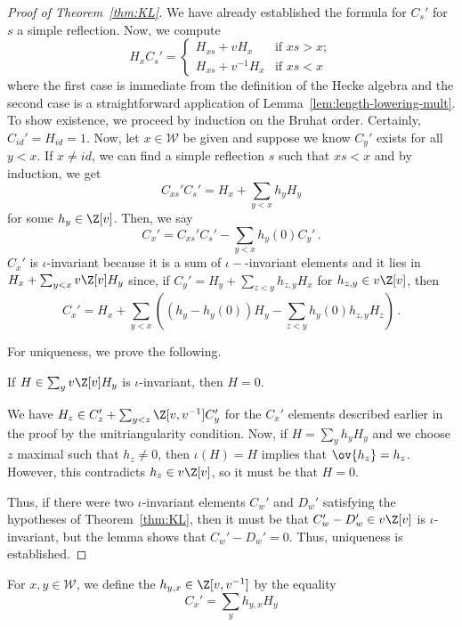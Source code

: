 \documentclass[11pt,leqno,oneside]{amsart}
\numberwithin{thm}{section}
\renewcommand{\W}{\mathcal{W}}
\begin{document}
\begin{proof}[Proof of Theorem~\ref{thm:KL}]
  We have already established the formula for \(C_s'\) for \(s\) a
  simple reflection. Now, we compute \[
    H_x C_s' =
    \begin{cases}
      H_{xs} + vH_x & \text{if } xs > x;\\
      H_{xs} + v^{-1} H_x & \text{if } xs < x
    \end{cases}
  \]
  where the first case is immediate from the definition of the Hecke
  algebra and the second case is a straightforward application
  of Lemma~\ref{lem:length-lowering-mult}. 
  To show existence, we proceed by induction on
  the Bruhat order. Certainly, \(C_{id}' = H_{id} = 1\). Now, let \(x
  \in \W\) be 
  given and suppose we know \(C_y'\) exists for all \(y < x\). If
  \(x \neq id\), we can find a simple reflection \(s\) such that \(xs
  < x\) and by induction, we get \[
    C_{xs}' C_s' = H_x + \sum_{y < x} h_y H_y
  \]
  for some \(h_y \in \Z[v]\). Then, we say \[
    C_x' = C_{xs}' C_s' - \sum_{y < x} h_y(0) C_y' \,.
  \]
  \(C_x'\) is \(\iota\)-invariant because it is a sum of
  \(\iota-\)-invariant elements and it lies in \(H_x + \sum_{y <
    x}v\Z[v] H_y \) since, if \(C_y' = H_y + \sum_{z < y} h_{z,y} H_x\) for
  \(h_{z,y} \in v\Z[v]\),
  then \[
    C_x' = H_x + \sum_{y < x} \left( (h_y - h_y(0)) H_y - \sum_{z<y}
      h_y(0) h_{z,y} H_z \right) \,. 
  \]

  For uniqueness, we prove the following.
  \begin{lem}
    If \(H \in \sum_y v \Z[v] H_y\) is \(\iota\)-invariant, then \(H =
    0\). 
  \end{lem}
  We have \(H_z \in C_z' + \sum_{y < z}\Z[v,v^{-1}] C_y'\) for the
  \(C_x'\) elements described earlier in the proof by the
  unitriangularity condition.  Now, if \(H = \sum_y h_y H_y\) and we
  choose \(z\) maximal such that \(h_z \neq 0\), then \(\iota(H) = H\)
  implies that \(\ov{h_z} = h_z\). However, this contradicts \(h_z \in
  v\Z[v]\), so it must be that \(H = 0\).

  Thus, if there were two \(\iota\)-invariant elements \(C_w'\) and
  \(D_w'\) satisfying the hypotheses of Theorem~\ref{thm:KL}, then it must be
  that \(C_w'-D_w' \in v \Z[v]\) is \(\iota\)-invariant, but the lemma
  shows that \(C_w'-D_w' = 0\). Thus, uniqueness is established.
\end{proof}
\begin{defn}
  For \(x,y \in \W\), we define the 
  \(h_{y,x} \in \Z[v,v^{-1}]\) by the 
  equality \[
    C_x' = \sum_y h_{y,x} H_y
  \]
\end{defn}
\end{document}
